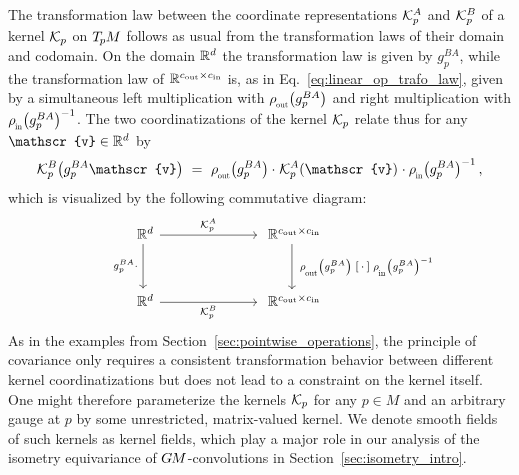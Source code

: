 The transformation law between the coordinate representations $\mathcal{K}_p^A$ and $\mathcal{K}_p^B$ of a kernel $\mathcal{K}_p$ on $T_{\mkern-1.5mu p}\mkern-.5muM$ follows as usual from the transformation laws of their domain and codomain.
On the domain $\mathbb{R}^d$ the transformation law is given by $g_p^{BA}$, while the transformation law of $\mathbb{R}^{{c_\textup{out}}\times{c_\textup{in}}}$ is, as in Eq.~\eqref{eq:linear_op_trafo_law}, given by a simultaneous left multiplication with $\rhoout\big(g_p^{BA}\big)$ and right multiplication with $\rhoin\big(g_p^{BA}\big)^{-1}$.
The two coordinatizations of the kernel $\mathcal{K}_p$ relate thus for any $\mathscr{v} \in \R^d$ by
\begin{align}\label{eq:kernel_trafo_law}
    \Kp^B\big(g_p^{BA} \mathscr{v}\big)\ =\ 
    \rhoout\big(g_p^{BA}\big) \cdot\mkern1mu 
    \Kp^A (\mathscr{v})
    \mkern1mu\cdot \rhoin\big(g_p^{BA}\big)^{-1} \,,
\end{align}
which is visualized by the following commutative diagram:
\begin{equation}\label{cd:kernel_trafo_law}
\qquad
\begin{tikzcd}[column sep=70pt, row sep=32pt, font=\normalsize]
    \R^d
        \arrow[d, "g_p^{BA} \cdot\,"']
        \arrow[r, "\Kp^A"]
    &
    \R^{\cout\times\cin}
        \arrow[d, "\ \rhoout\big(g_p^{BA}\big) \; \scalebox{1.1}{$[\,\cdot\,]$} \; \rhoin\big(g_p^{BA}\big)^{-1}"]
    \\
    \R^d
        \arrow[r, "\Kp^B"']
    &
    \R^{\cout\times\cin}
\end{tikzcd}
\end{equation}
As in the examples from Section~\ref{sec:pointwise_operations}, the principle of covariance only requires a consistent transformation behavior between different kernel coordinatizations but does not lead to a constraint on the kernel itself.
One might therefore parameterize the kernels $\mathcal{K}_p$ for any $p\in M$ and an arbitrary gauge at $p$ by some unrestricted, matrix-valued kernel.
We denote smooth fields of such kernels as kernel fields, which play a major role in our analysis of the isometry equivariance of $G\mkern-1.4muM$-convolutions in Section~\ref{sec:isometry_intro}.




